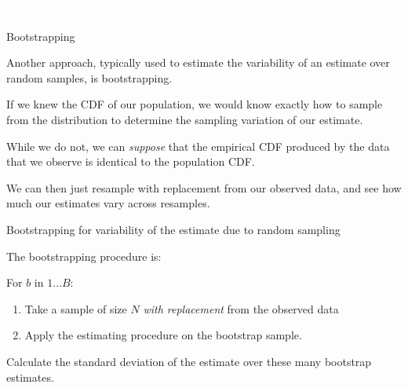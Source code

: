 \documentclass[xcolor={table}, handout]{beamer}
\begin{document}
\begin{transitionframe}
\centering

\LARGE \textcolor{white}{Bootstrapping.}

\end{transitionframe}

\begin{frame}{Bootstrapping}


\begin{wideitemize}
\item Another approach, typically used to estimate the variability of an estimate over random samples, is bootstrapping.
\pause

\item If we knew the CDF of our population, we would know exactly how to sample from the distribution to determine the sampling variation of our estimate.
\pause

\item While we do not, we can  \textit{suppose} that the empirical CDF produced by the data that we observe is identical to the population CDF.
\pause

\item We can then just resample with replacement from our observed data, and see how much our estimates vary across resamples.
\end{wideitemize}

\end{frame}





\begin{frame}{Bootstrapping for variability of the estimate due to random sampling}


The bootstrapping procedure is:

\begin{wideitemize}
\item For $b$ in $1\dots B$:
\begin{enumerate}

    \item Take a sample of size $N$  \textit{with replacement} from the observed data\pause

    \item Apply the estimating procedure on the bootstrap sample.%
    \end{enumerate}
\pause

\item Calculate the standard deviation of the estimate over these many bootstrap estimates.
\end{wideitemize}

\end{frame}
\end{document}
